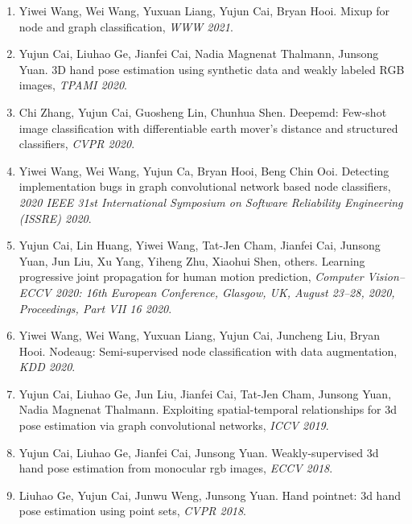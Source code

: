 \begin{enumerate}
\item Yiwei Wang, Wei Wang, Yuxuan Liang, Yujun Cai, Bryan Hooi. Mixup for node and graph classification, \textit{WWW 2021}.

\item Yujun Cai, Liuhao Ge, Jianfei Cai, Nadia Magnenat Thalmann, Junsong Yuan. 3D hand pose estimation using synthetic data and weakly labeled RGB images, \textit{TPAMI 2020}.

\item Chi Zhang, Yujun Cai, Guosheng Lin, Chunhua Shen. Deepemd: Few-shot image classification with differentiable earth mover's distance and structured classifiers, \textit{CVPR 2020}.

\item Yiwei Wang, Wei Wang, Yujun Ca, Bryan Hooi, Beng Chin Ooi. Detecting implementation bugs in graph convolutional network based node classifiers, \textit{2020 IEEE 31st International Symposium on Software Reliability Engineering (ISSRE) 2020}.

\item Yujun Cai, Lin Huang, Yiwei Wang, Tat-Jen Cham, Jianfei Cai, Junsong Yuan, Jun Liu, Xu Yang, Yiheng Zhu, Xiaohui Shen, others. Learning progressive joint propagation for human motion prediction, \textit{Computer Vision--ECCV 2020: 16th European Conference, Glasgow, UK, August 23--28, 2020, Proceedings, Part VII 16 2020}.

\item Yiwei Wang, Wei Wang, Yuxuan Liang, Yujun Cai, Juncheng Liu, Bryan Hooi. Nodeaug: Semi-supervised node classification with data augmentation, \textit{KDD 2020}.

\item Yujun Cai, Liuhao Ge, Jun Liu, Jianfei Cai, Tat-Jen Cham, Junsong Yuan, Nadia Magnenat Thalmann. Exploiting spatial-temporal relationships for 3d pose estimation via graph convolutional networks, \textit{ICCV 2019}.

\item Yujun Cai, Liuhao Ge, Jianfei Cai, Junsong Yuan. Weakly-supervised 3d hand pose estimation from monocular rgb images, \textit{ECCV 2018}.

\item Liuhao Ge, Yujun Cai, Junwu Weng, Junsong Yuan. Hand pointnet: 3d hand pose estimation using point sets, \textit{CVPR 2018}.
\end{enumerate}